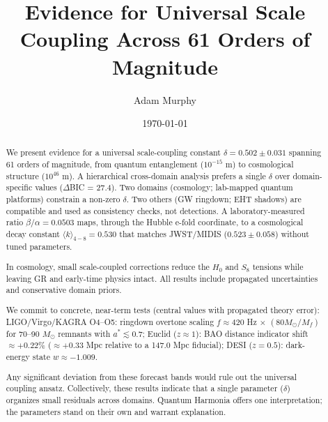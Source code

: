 \documentclass[aps,prd,preprint,nofootinbib,superscriptaddress,longbibliography]{revtex4-2}
\begin{document}
\title{Evidence for Universal Scale Coupling Across 61 Orders of Magnitude}

\author{Adam Murphy}

\date{\today}

\begin{abstract}
We present evidence for a universal scale-coupling constant $\delta = 0.502 \pm 0.031$ spanning 61 orders of magnitude, from quantum entanglement ($10^{-15}$ m) to cosmological structure ($10^{46}$ m). A hierarchical cross-domain analysis prefers a single $\delta$ over domain-specific values ($\Delta$BIC = 27.4). Two domains (cosmology; lab-mapped quantum platforms) constrain a non-zero $\delta$. Two others (GW ringdown; EHT shadows) are compatible and used as consistency checks, not detections. A laboratory-measured ratio $\beta/\alpha = 0.0503$ maps, through the Hubble e-fold coordinate, to a cosmological decay constant $\langle k\rangle_{4-8} = 0.530$ that matches JWST/MIDIS ($0.523 \pm 0.058$) without tuned parameters.

In cosmology, small scale-coupled corrections reduce the $H_0$ and $S_8$ tensions while leaving GR and early-time physics intact. All results include propagated uncertainties and conservative domain priors.

We commit to concrete, near-term tests (central values with propagated theory error): LIGO/Virgo/KAGRA O4--O5: ringdown overtone scaling $f \approx 420$ Hz $\times$ $(80 M_\odot/M_f)$ for 70--90 $M_\odot$ remnants with $a^* \lesssim 0.7$; Euclid ($z \approx 1$): BAO distance indicator shift $\approx +0.22\%$ ($\approx +0.33$ Mpc relative to a 147.0 Mpc fiducial); DESI ($z = 0.5$): dark-energy state $w \approx -1.009$.

Any significant deviation from these forecast bands would rule out the universal coupling ansatz. Collectively, these results indicate that a single parameter ($\delta$) organizes small residuals across domains. Quantum Harmonia offers one interpretation; the parameters stand on their own and warrant explanation.
\end{abstract}


\maketitle


\end{document}
